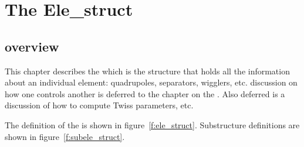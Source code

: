 \chapter{The Ele\_struct}
\section{overview}

This chapter describes the  which is the structure that
holds all the information about an individual element: quadrupoles,
separators, wigglers, etc. discussion on how one  controls
another is deferred to the chapter on the . Also deferred
is a discussion of how to compute Twiss parameters, etc.

The definition of the  is shown
in figure~\ref{f:ele_struct}. Substructure definitions are shown in
figure~\ref{f:subele_struct}. 

